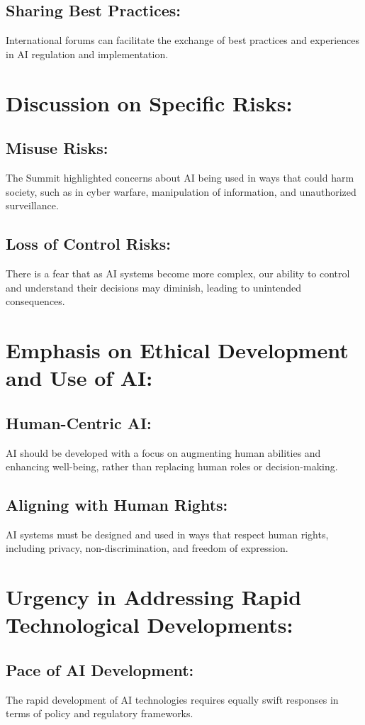 \documentclass{article}
\begin{document}
\subsection{Sharing Best Practices:}
International forums can facilitate the exchange of best practices and experiences in AI regulation and implementation.

\section{Discussion on Specific Risks:}
\subsection{Misuse Risks:}
The Summit highlighted concerns about AI being used in ways that could harm society, such as in cyber warfare, manipulation of information, and unauthorized surveillance.

\subsection{Loss of Control Risks:}
There is a fear that as AI systems become more complex, our ability to control and understand their decisions may diminish, leading to unintended consequences.

\section{Emphasis on Ethical Development and Use of AI:}
\subsection{Human-Centric AI:}
AI should be developed with a focus on augmenting human abilities and enhancing well-being, rather than replacing human roles or decision-making.

\subsection{Aligning with Human Rights:}
AI systems must be designed and used in ways that respect human rights, including privacy, non-discrimination, and freedom of expression.

\section{Urgency in Addressing Rapid Technological Developments:}
\subsection{Pace of AI Development:}
The rapid development of AI technologies requires equally swift responses in terms of policy and regulatory frameworks.
\end{document}
